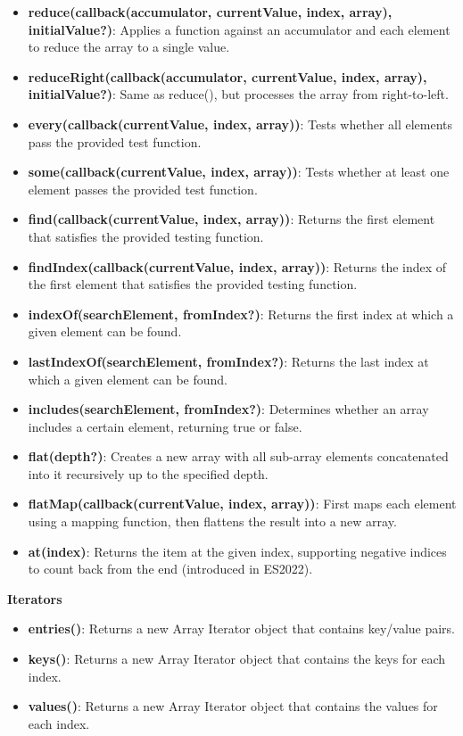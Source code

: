 \documentclass{report}
\begin{document}
\begin{itemize}
        \item \textbf{reduce(callback(accumulator, currentValue, index, array), initialValue?)}: Applies a function against an accumulator and each element to reduce the array to a single value.
        \item \textbf{reduceRight(callback(accumulator, currentValue, index, array), initialValue?)}: Same as reduce(), but processes the array from right-to-left.
        \item \textbf{every(callback(currentValue, index, array))}: Tests whether all elements pass the provided test function.
        \item \textbf{some(callback(currentValue, index, array))}: Tests whether at least one element passes the provided test function.
        \item \textbf{find(callback(currentValue, index, array))}: Returns the first element that satisfies the provided testing function.
        \item \textbf{findIndex(callback(currentValue, index, array))}: Returns the index of the first element that satisfies the provided testing function.
        \item \textbf{indexOf(searchElement, fromIndex?)}: Returns the first index at which a given element can be found.
        \item \textbf{lastIndexOf(searchElement, fromIndex?)}: Returns the last index at which a given element can be found.
        \item \textbf{includes(searchElement, fromIndex?)}: Determines whether an array includes a certain element, returning true or false.
        \item \textbf{flat(depth?)}: Creates a new array with all sub-array elements concatenated into it recursively up to the specified depth.
        \item \textbf{flatMap(callback(currentValue, index, array))}: First maps each element using a mapping function, then flattens the result into a new array.
        \item \textbf{at(index)}: Returns the item at the given index, supporting negative indices to count back from the end (introduced in ES2022).
    \end{itemize}
    \bigbreak \noindent 
    \textbf{Iterators}
    \begin{itemize}
        \item \textbf{entries()}: Returns a new Array Iterator object that contains key/value pairs.
        \item \textbf{keys()}: Returns a new Array Iterator object that contains the keys for each index.
        \item \textbf{values()}: Returns a new Array Iterator object that contains the values for each index.
    \end{itemize}
\end{document}

